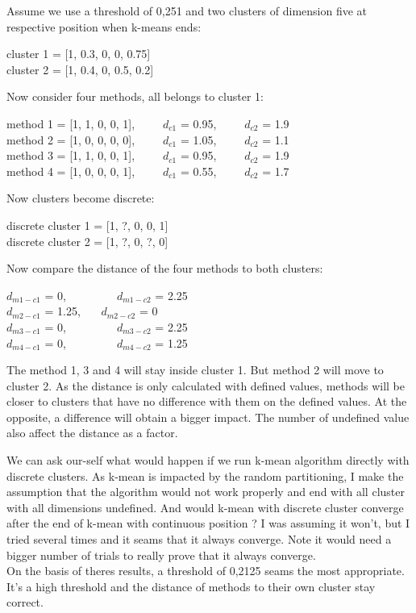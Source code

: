 \documentclass[12pt]{article}
\newcommand{\code}[1]{{\fontfamily{phv}\selectfont \small{\begin{tabbing} #1 \end{tabbing}}}}
\begin{document}
\begin{enumerate}
Assume we use a threshold of 0,251 and two clusters of dimension five at respective position when k-means ends:\code{
cluster 1  = [1, 0.3, 0, 0, 0.75]\\
cluster 2 = [1, 0.4, 0, 0.5, 0.2]}
Now consider four methods, all belongs to cluster 1:
\code{method 1 = [1, 1, 0, 0, 1],\ \ \ \ \  $d_{c1}$ = 0.95,\ \ \ \ \  $d_{c2}$ = 1.9\\
method 2 = [1, 0, 0, 0, 0],\ \ \ \ \  $d_{c1}$ = 1.05,\ \ \ \ \  $d_{c2}$ = 1.1\\
method 3 = [1, 1, 0, 0, 1],\ \ \ \ \ $d_{c1}$ = 0.95,\ \ \ \ \  $d_{c2}$ = 1.9\\
method 4 = [1, 0, 0, 0, 1],\ \ \ \ \ $d_{c1}$ = 0.55,\ \ \ \ \  $d_{c2}$ = 1.7}
Now clusters become discrete: \code{
discrete cluster 1 = [1, ?, 0, 0, 1]\\
discrete cluster 2 = [1, ?, 0, ?, 0]}
Now compare the distance of the four methods to both clusters: \code{
 $d_{m1-c1}$ = 0,\ \ \ \ \ \ \ \ \ $d_{m1-c2}$ = 2.25\\
$d_{m2-c1}$ = 1.25, \ \ \ $d_{m2-c2}$ = 0\\
$d_{m3-c1}$ = 0,\ \ \ \ \ \ \ \ \ $d_{m3-c2}$ = 2.25\\
$d_{m4-c1}$ = 0,\ \ \ \ \ \ \ \ \ $d_{m4-c2}$ = 1.25}
The method 1, 3 and 4 will stay inside cluster 1. But method 2 will move to cluster 2. As the distance is only calculated with defined values, methods will be closer to clusters that have no difference with them on the defined values. At the opposite, a difference will obtain a bigger impact. The number of undefined value also affect the distance as a factor.
\end{enumerate}
We can ask our-self what would happen if we run k-mean algorithm directly with discrete clusters. As k-mean is impacted by the random partitioning, I make the assumption that the algorithm would not work properly and end with all cluster with all dimensions undefined. And would k-mean with discrete cluster converge after the end of k-mean with continuous position ? I was assuming it won't, but I tried several times and it seams that it always converge. Note it would need a bigger number of trials to really prove that it always converge.\\
On the basis of theres results, a threshold of 0,2125 seams the most appropriate. It's a high threshold and the distance of methods to their own cluster stay correct.
\end{document}
